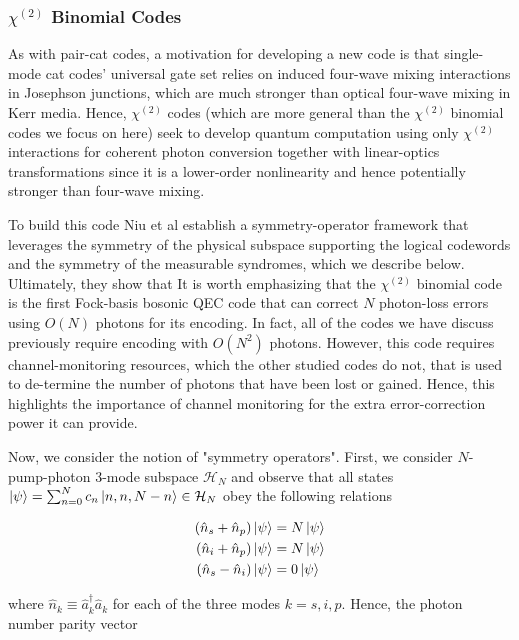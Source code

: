 \documentclass[12]{amsart}
\newcommand\0{\mathbf{0}}
\newcommand\<{\langle}
\renewcommand\>{\rangle}
\begin{document}
\subsubsection{$\chi^{(2)}$ Binomial Codes}
\label{sec:multi-binom}

As with pair-cat codes, a motivation for developing a new code is that single-mode cat codes’ universal gate set relies on induced four-wave mixing interactions in Josephson junctions, which are much stronger than optical four-wave mixing in Kerr media. Hence, $\chi^{(2)}$ codes (which are more general than the $\chi^{(2)}$ binomial codes we focus on here) seek to develop quantum computation using only $\chi^{(2)}$ interactions for coherent photon conversion together with linear-optics transformations \cite{niu2018hardware} since it is a lower-order nonlinearity and hence potentially stronger than four-wave mixing.

To build this code Niu et al establish a symmetry-operator framework that leverages the symmetry of the physical subspace supporting the logical codewords and the symmetry of the measurable syndromes, which we describe below. Ultimately, they show that It is worth emphasizing that the $\chi^{(2)}$ binomial code is the first Fock-basis bosonic QEC code that can correct $N$  photon-loss errors using $O(N)$ photons for its encoding. In fact, all of the codes we have discuss previously require encoding with $O(N^2)$ photons. However, this code requires channel-monitoring resources, which the other studied codes do not, that is used to de-termine the number of photons that have been lost or gained. Hence, this highlights the importance of channel monitoring for the extra error-correction power it can provide.

Now, we consider the notion of "symmetry operators". First, we consider $N$-pump-photon 3-mode subspace $\mathcal{H}_N$ and observe that all states $\ket{\psi} = \sum_{n=0}^N c_n \ket{n, n, N-n} \in \mathcal{H}_N$ obey the following relations

\begin{align}
\begin{split}
	(\hat{n}_s + \hat{n}_p) \ket{\psi} &= N\ket{\psi} \\
	(\hat{n}_i + \hat{n}_p) \ket{\psi} &= N\ket{\psi} \\
	(\hat{n}_s - \hat{n}_i) \ket{\psi} &= 0\ket{\psi}
\end{split}
\end{align}

where $\hat{n}_k \equiv \hat{a}_k^\dag\hat{a}_k$ for each of the three modes $k = s, i, p$. Hence, the photon number parity vector
\end{document}
